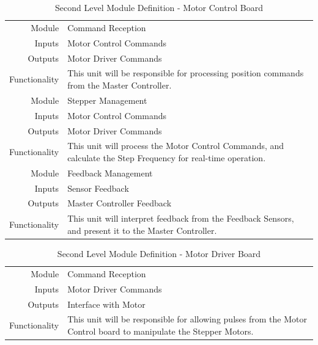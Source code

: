 \begin{table}[ht] 
	\caption{Second Level Module Definition - Motor Control Board}
	\label{table:secondlevelmotor}
	\centering 
	\begin{tabular}{|r p{10cm}|} 
		\hline\hline 
		Module		& Command Reception \\ 
		Inputs		& Motor Control Commands	\\ 
		Outputs		& Motor Driver Commands \\ 
		Functionality	& This unit will be responsible for processing position commands from the Master Controller.\\ 
		\hline\hline 
		Module		& Stepper Management \\ 
		Inputs		& Motor Control Commands \\ 
		Outputs		& Motor Driver Commands \\ 
		Functionality	& This unit will process the Motor Control Commands, and calculate the Step Frequency for real-time operation.\\
		\hline\hline  
		Module		& Feedback Management \\ 
		Inputs		& Sensor Feedback \\ 
		Outputs		& Master Controller Feedback \\ 
		Functionality	& This unit will interpret feedback from the Feedback Sensors, and present it to the Master Controller. \\
		\hline
		\end{tabular} 
\end{table}

\begin{table}[ht] 
	\caption{Second Level Module Definition - Motor Driver Board}
	\label{table:secondleveldriver}
	\centering 
	\begin{tabular}{|r p{10cm}|} 
		\hline\hline 
		Module		& Command Reception \\ 
		Inputs		& Motor Driver Commands	\\ 
		Outputs		& Interface with Motor \\ 
		Functionality	& This unit will be responsible for allowing pulses from the Motor Control board to manipulate the Stepper Motors.\\
		\hline
		\end{tabular} 
\end{table}
